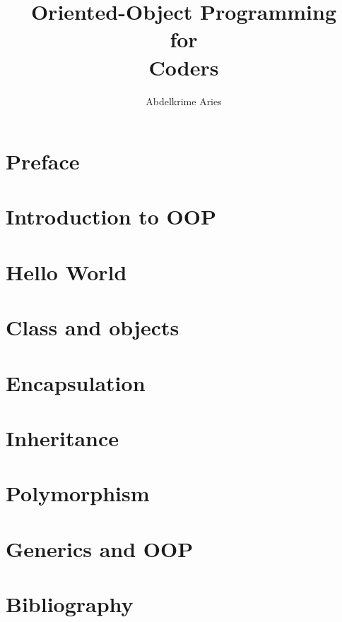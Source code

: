 \documentclass{KodeBook}
\title{Oriented-Object Programming\\ for\\ Coders}
\author{Abdelkrime Aries}
\begin{document}
\maketitle



\chapter*{Preface}


\chapter{Introduction to OOP}


\chapter{Hello World}


\chapter{Class and objects}


\chapter{Encapsulation}


\chapter{Inheritance}



\chapter{Polymorphism}


\chapter{Generics and OOP}


\chapter*{Bibliography}

%
\end{document}
